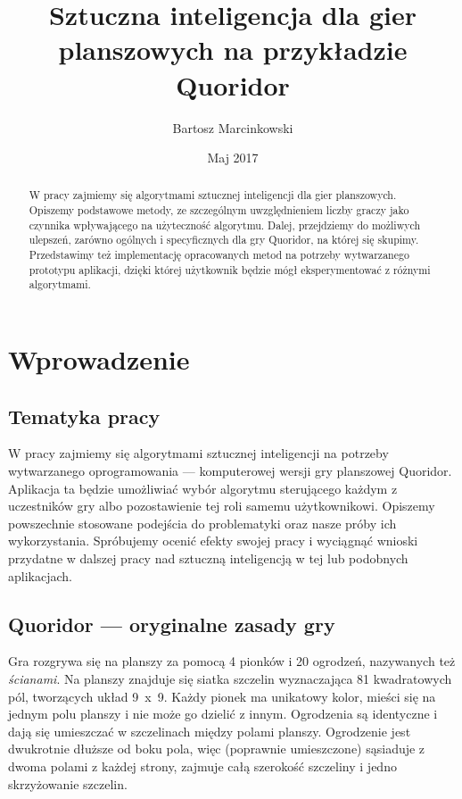 \documentclass{pracamgr}
\author{Bartosz Marcinkowski}
\title{Sztuczna inteligencja dla gier planszowych na przykładzie Quoridor}
\date{Maj 2017}
\begin{document}
\maketitle

\begin{abstract}
W pracy zajmiemy się algorytmami sztucznej inteligencji dla gier planszowych.
Opiszemy podstawowe metody, ze szczególnym uwzględnieniem liczby graczy jako czynnika wpływającego na użyteczność algorytmu.
Dalej, przejdziemy do możliwych ulepszeń, zarówno ogólnych i specyficznych dla gry Quoridor, na której się skupimy.
Przedstawimy też implementację opracowanych metod na potrzeby wytwarzanego prototypu aplikacji, dzięki której użytkownik będzie mógł eksperymentować z różnymi algorytmami.
\end{abstract}

\tableofcontents


\chapter{Wprowadzenie}

\section{Tematyka pracy}

W pracy zajmiemy się algorytmami sztucznej inteligencji na potrzeby wytwarzanego oprogramowania --- komputerowej wersji gry planszowej Quoridor.
Aplikacja ta będzie umożliwiać wybór algorytmu sterującego każdym z uczestników gry albo pozostawienie tej roli samemu użytkownikowi.
Opiszemy powszechnie stosowane podejścia do problematyki oraz nasze próby ich wykorzystania.
Spróbujemy ocenić efekty swojej pracy i wyciągnąć wnioski przydatne w dalszej pracy nad sztuczną inteligencją w tej lub podobnych aplikacjach.

\section{Quoridor --- oryginalne zasady gry}

Gra rozgrywa się na planszy za pomocą 4 pionków i 20 ogrodzeń, nazywanych też \emph{ścianami}. Na planszy znajduje się siatka szczelin wyznaczająca 81 kwadratowych pól, tworzących układ 9~x~9. Każdy pionek ma unikatowy kolor, mieści się na jednym polu planszy i nie może go dzielić z innym. Ogrodzenia są identyczne i dają się umieszczać w szczelinach między polami planszy. Ogrodzenie jest dwukrotnie dłuższe od boku pola, więc (poprawnie umieszczone) sąsiaduje z dwoma polami z każdej strony, zajmuje całą szerokość szczeliny i jedno skrzyżowanie szczelin.
\end{document}
